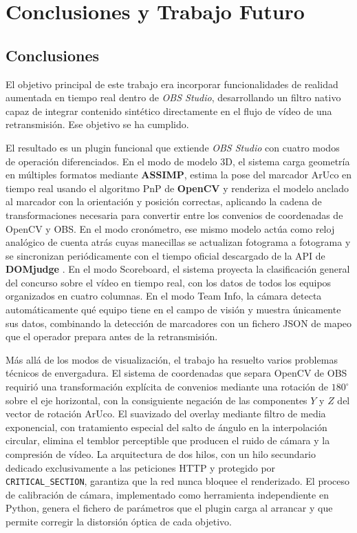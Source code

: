 \chapter{Conclusiones y Trabajo Futuro}
\label{cap:conclusiones}


\section{Conclusiones}

El objetivo principal de este trabajo era incorporar funcionalidades de realidad aumentada en tiempo real dentro de \textit{OBS Studio}, desarrollando un filtro nativo capaz de integrar contenido sintético directamente en el flujo de vídeo de una retransmisión. Ese objetivo se ha cumplido.

El resultado es un plugin funcional que extiende \textit{OBS Studio} con cuatro modos de operación diferenciados. En el modo de modelo 3D, el sistema carga geometría en múltiples formatos mediante \textbf{ASSIMP}, estima la pose del marcador ArUco en tiempo real usando el algoritmo PnP de \textbf{OpenCV} y renderiza el modelo anclado al marcador con la orientación y posición correctas, aplicando la cadena de transformaciones necesaria para convertir entre los convenios de coordenadas de OpenCV y OBS. En el modo cronómetro, ese mismo modelo actúa como reloj analógico de cuenta atrás cuyas manecillas se actualizan fotograma a fotograma y se sincronizan periódicamente con el tiempo oficial descargado de la API de \textbf{DOMjudge} \citep{DOMjudge}. En el modo Scoreboard, el sistema proyecta la clasificación general del concurso sobre el vídeo en tiempo real, con los datos de todos los equipos organizados en cuatro columnas. En el modo Team Info, la cámara detecta automáticamente qué equipo tiene en el campo de visión y muestra únicamente sus datos, combinando la detección de marcadores con un fichero JSON de mapeo que el operador prepara antes de la retransmisión.

Más allá de los modos de visualización, el trabajo ha resuelto varios problemas técnicos de envergadura. El sistema de coordenadas que separa OpenCV de OBS requirió una transformación explícita de convenios mediante una rotación de $180^\circ$ sobre el eje horizontal, con la consiguiente negación de las componentes $Y$ y $Z$ del vector de rotación ArUco. El suavizado del overlay mediante filtro de media exponencial, con tratamiento especial del salto de ángulo en la interpolación circular, elimina el temblor perceptible que producen el ruido de cámara y la compresión de vídeo. La arquitectura de dos hilos, con un hilo secundario dedicado exclusivamente a las peticiones HTTP y protegido por \texttt{CRITICAL\_SECTION}, garantiza que la red nunca bloquee el renderizado. El proceso de calibración de cámara, implementado como herramienta independiente en Python, genera el fichero de parámetros que el plugin carga al arrancar y que permite corregir la distorsión óptica de cada objetivo.


